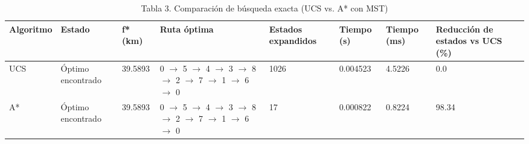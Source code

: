 \begin{table}[htbp]
  \centering
  \caption{Tabla 3. Comparación de búsqueda exacta (UCS vs. A* con MST)}
  \label{tab:tabla-3-busqueda-exacta}
  \begin{tabular}{llllllll}
    \toprule
    Algoritmo & Estado & f* (km) & Ruta óptima & Estados expandidos & Tiempo (s) & Tiempo (ms) & Reducción de estados vs UCS (\%) \\
    \midrule
    UCS & Óptimo encontrado & 39.5893 & 0 $\rightarrow$ 5 $\rightarrow$ 4 $\rightarrow$ 3 $\rightarrow$ 8 $\rightarrow$ 2 $\rightarrow$ 7 $\rightarrow$ 1 $\rightarrow$ 6 $\rightarrow$ 0 & 1026 & 0.004523 & 4.5226 & 0.0 \\
    A* & Óptimo encontrado & 39.5893 & 0 $\rightarrow$ 5 $\rightarrow$ 4 $\rightarrow$ 3 $\rightarrow$ 8 $\rightarrow$ 2 $\rightarrow$ 7 $\rightarrow$ 1 $\rightarrow$ 6 $\rightarrow$ 0 & 17 & 0.000822 & 0.8224 & 98.34 \\
    \bottomrule
  \end{tabular}
\end{table}
